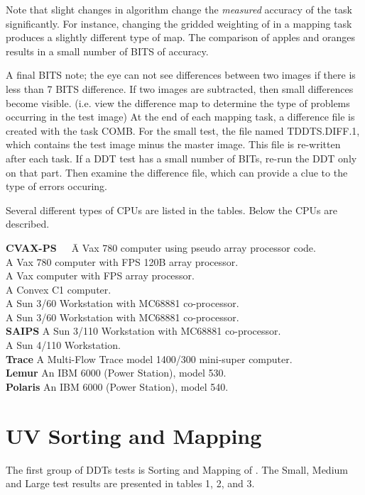 Note that slight changes in algorithm change the
{\it measured} accuracy of the task significantly.
For instance, changing the gridded weighting
of \uvdata in a mapping task
produces a slightly different type of map.
The comparison of apples and oranges results
in a small number of BITS of accuracy.

A final BITS note; the eye can not see differences between
two images if there is less than 7 BITS difference.
If two images are subtracted, then small differences
become visible.  (i.e. view the difference map to determine
the type of problems occurring in the test image)
At the end of each mapping task, a difference file is
created with the task COMB.
For the small test, the file named TDDTS.DIFF.1, which contains
the test image minus the master image.
This file is re-written after each task.
If a DDT test has a small number of BITs, re-run the DDT
only on that part.
Then examine the difference file, which can provide a
clue to the type of errors occuring.

Several different types of CPUs are listed in the tables.
Below the CPUs are described.

\begin{tabbing}
\={\bf CVAX-PS}~~~\= A Vax 780 computer using pseudo array processor code. \\
 \>A Vax 780 computer with FPS 120B array processor. \\
 \>A Vax computer with FPS array processor.\\
 \>A Convex C1 computer.\\
 \> A Sun 3/60 Workstation with MC68881 co-processor. \\
 \>A Sun 3/60 Workstation with MC68881 co-processor.\\
\> {\bf SAIPS} \>A Sun 3/110 Workstation with MC68881 co-processor.\\
 \> A Sun 4/110 Workstation. \\
\> {\bf Trace}\> A Multi-Flow Trace model 1400/300
mini-super computer. \\
\> {\bf Lemur}\> An IBM 6000 (Power Station), model 530. \\
\> {\bf Polaris}\> An IBM 6000 (Power Station), model 540. \\
\end{tabbing}

\section{UV Sorting and Mapping}
The first group of DDTs tests is Sorting and Mapping of \uvdata.
The Small, Medium and Large test results are presented
in tables 1, 2, and 3.

